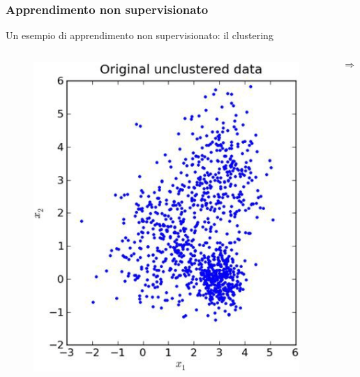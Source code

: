 \begin{frame}

	\frametitle{Apprendimento non supervisionato}

	\begin{block}{Un esempio di apprendimento non supervisionato: il clustering}
	
		\begin{columns}
			\begin{figure}[!htbp]
				\centering
				\includegraphics[width=1.0\linewidth]{images/glossary/unsupervised_learning_2_1.png}
			\end{figure}
			
			\begin{Huge}
				$$\pmb{\Rightarrow}$$
			\end{Huge}
			
			\pause
			

\end{columns}
\end{block}
\end{frame}
